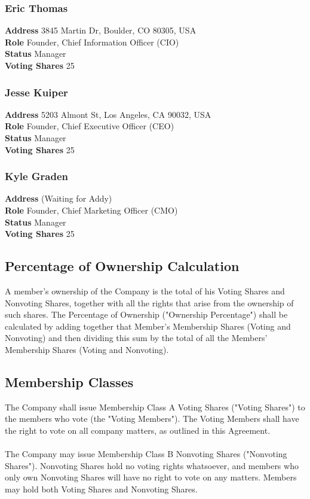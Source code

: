 \documentclass[11pt]{article}
\begin{document}
\subsubsection{Eric Thomas}
\textbf{Address} 3845 Martin Dr, Boulder, CO 80305, USA\\
\textbf{Role} Founder, Chief Information Officer (CIO)\\
\textbf{Status} Manager \\
\textbf{Voting Shares} 25

\subsubsection{Jesse Kuiper}
\textbf{Address} 5203 Almont St, Los Angeles, CA 90032, USA\\
\textbf{Role} Founder, Chief Executive Officer (CEO)\\
\textbf{Status} Manager \\
\textbf{Voting Shares} 25

\subsubsection{Kyle Graden}
\textbf{Address} (Waiting for Addy)\\
\textbf{Role} Founder, Chief Marketing Officer (CMO)\\
\textbf{Status} Manager \\
\textbf{Voting Shares} 25

\subsection{Percentage of Ownership Calculation}
A member's ownership of the Company is the total of his Voting Shares and Nonvoting Shares, together with all the rights that arise from the ownership of such shares. The Percentage of Ownership ("Ownership Percentage") shall be calculated by adding together that Member's Membership Shares (Voting and Nonvoting) and then dividing this sum by the total of all the Members' Membership Shares (Voting and Nonvoting).

\subsection{Membership Classes}
\label{sec:membershipClasses}
The Company shall issue Membership Class A Voting Shares ("Voting Shares") to the members who vote (the "Voting Members"). The Voting Members shall have the right to vote on all company matters, as outlined in this Agreement.\\\\
The Company may issue Membership Class B Nonvoting Shares ("Nonvoting Shares"). Nonvoting Shares hold no voting rights whatsoever, and members who only own Nonvoting Shares will have no right to vote on any matters. Members may hold both Voting Shares and Nonvoting Shares.
\end{document}
